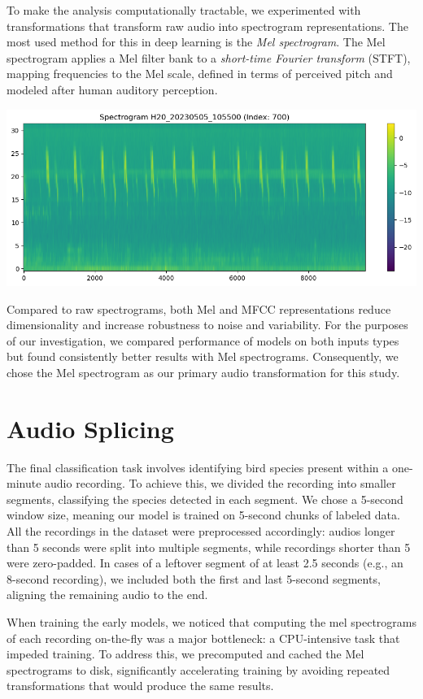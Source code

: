 \documentclass[10pt]{article}
\begin{document}
To make the analysis computationally tractable, we experimented with transformations that transform raw audio into spectrogram representations. The most used method for this in deep learning is the \emph{Mel spectrogram}. The Mel spectrogram applies a Mel filter bank to a \emph{short-time Fourier transform} (STFT), mapping frequencies to the Mel scale, defined in terms of perceived pitch and modeled after human auditory perception.

\begin{center}
  \includegraphics[width=0.7\linewidth]{img/scape_spectrogram.png}
\end{center}

Compared to raw spectrograms, both Mel and MFCC representations reduce dimensionality and increase robustness to noise and variability. For the purposes of our investigation, we compared performance of models on both inputs types but found consistently better results with Mel spectrograms. Consequently, we chose the Mel spectrogram as our primary audio transformation for this study.

\section*{Audio Splicing}

The final classification task involves identifying bird species present within a one-minute audio recording. To achieve this, we divided the recording into smaller segments, classifying the species detected in each segment. We chose a 5-second window size, meaning our model is trained on 5-second chunks of labeled data. All the recordings in the dataset were preprocessed accordingly: audios longer than 5 seconds were split into multiple segments, while recordings shorter than 5 were zero-padded. In cases of a leftover segment of at least 2.5 seconds (e.g., an 8-second recording), we included both the first and last 5-second segments, aligning the remaining audio to the end.

When training the early models, we noticed that computing the mel spectrograms of each recording on-the-fly was a major bottleneck: a CPU-intensive task that impeded training. To address this, we precomputed and cached the Mel spectrograms to disk, significantly accelerating training by avoiding repeated transformations that would produce the same results.
\end{document}

